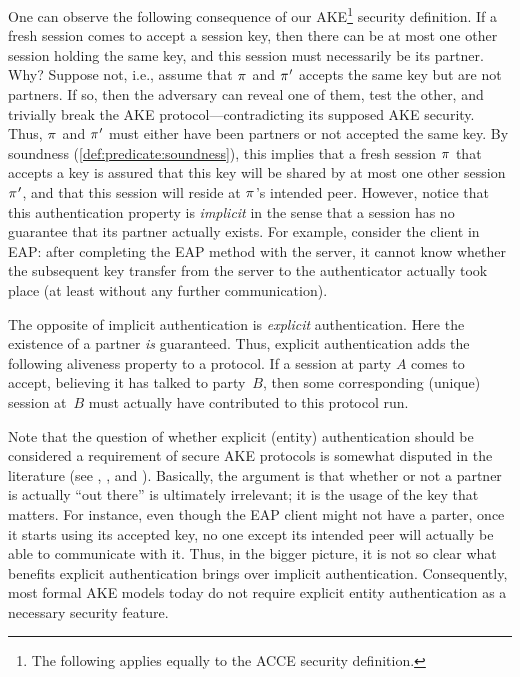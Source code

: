 One can observe the following consequence of our AKE\footnote{The following applies equally to the ACCE security definition.
} 
security definition. 
If a fresh session comes to accept a session key,
then there can be at most one other session holding the same key,
and this session must necessarily be its partner.
Why? 
Suppose not,
i.e., assume that $\oracle$ and $\oracle'$ accepts the same key but are not partners. 
If so,
then the adversary can reveal one of them,
test the other,
and trivially break the AKE protocol---contradicting its supposed AKE security.
Thus,
$\oracle$ and $\oracle'$ must either have been partners or not accepted the same key.
By soundness (\cref{def:predicate:soundness}),
this implies that a fresh session $\oracle$ that accepts a key is assured that this key will be shared by at most one other session $\oracle'$,
and that this session will reside at $\oracle$'s intended peer.
However,
notice that this authentication property is \emph{implicit} in the sense that a session has no guarantee that its partner actually exists.
For example,
consider the client in EAP:
after completing the EAP method with the server,
it cannot know whether the subsequent key transfer from the server to the authenticator actually took place
(at least without any further communication).
%  

The opposite of implicit  authentication is \emph{explicit} authentication.
Here the existence of a partner  \emph{is} guaranteed.
Thus,
explicit authentication adds the following aliveness property to a protocol.
If a session at party $A$ comes to accept,
believing it has talked to party~$B$,
then some corresponding (unique) session at~$B$ must actually have contributed to this protocol run.

Note that the question of whether explicit (entity) authentication should be considered a requirement of secure AKE protocols is somewhat disputed in the literature
(see \cite[§1.6]{STOC:BelRog95}, \cite[§6]{Rogaway:2004:role_of_definitions}, and \cite[§2.1]{C:Krawczyk03}).
Basically,
the argument is that whether or not a partner is actually ``out there'' is ultimately irrelevant;
it is the usage of the key that matters.
For instance,
even though the EAP client might not have a parter,
once it starts using its accepted key,
no one except its intended peer will actually be able to communicate with it.
Thus,
in the bigger picture,
it is not so clear what benefits explicit authentication brings over implicit authentication.
Consequently,
most formal AKE models today do not require explicit entity authentication as a necessary security feature.



